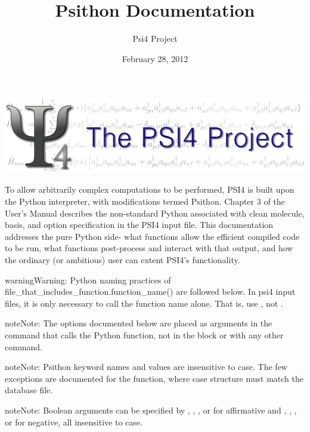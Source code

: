 \documentclass[letterpaper,10pt,english]{sphinxmanual}
\title{Psithon Documentation}
\date{February 28, 2012}
\author{Psi4 Project}
\begin{document}
\maketitle
\tableofcontents
{}\label{index::doc}
\includegraphics[width=1.000\linewidth]{PSI4_3.png}



To allow arbitrarily complex computations to be performed, PSI4 is built
upon the Python interpreter, with modifications termed Psithon. Chapter 3
of the User's Manual describes the non-standard Python associated with
clean molecule, basis, and option specification in the PSI4 input file.
This documentation addresses the pure Python side- what functions allow
the efficient compiled code to be run, what functions post-process and
interact with that output, and how the ordinary (or ambitious) user can
extent PSI4's functionality.

\begin{notice}{warning}{Warning:}
Python naming practices of file\_that\_includes\_function.function\_name()
are followed below. In psi4 input files, it is only necessary to call the
function name alone. That is, use , not .
\end{notice}

\begin{notice}{note}{Note:}
The options documented below are placed as arguments in the command that
calls the Python function, not in the  block or with any
other  command.
\end{notice}

\begin{notice}{note}{Note:}
Psithon keyword names and values are insensitive to case. The few
exceptions are documented for the  function, where case
structure must match the database file.
\end{notice}

\begin{notice}{note}{Note:}
Boolean arguments can be specified by , , , or 
for affirmative and , , , or  for negative,
all insensitive to case.
\end{notice}
\end{document}
